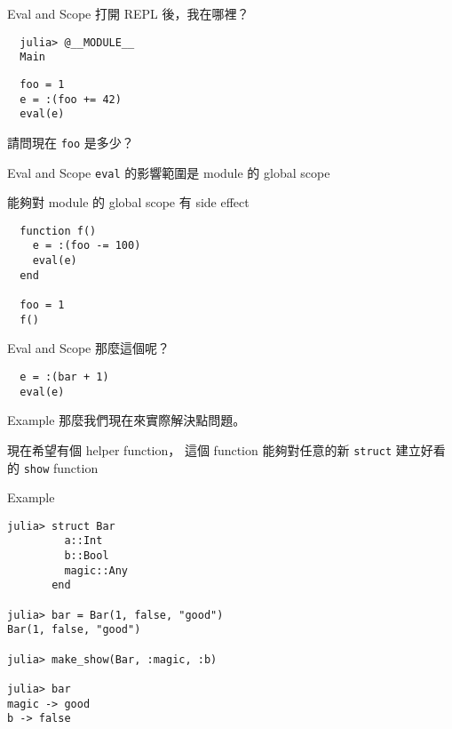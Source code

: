 \documentclass[14pt]{beamer}
\begin{document}
\begin{frame}[fragile]{Eval and Scope}
  打開 REPL 後，我在哪裡？

  \pause

\begin{lstlisting}
  julia> @__MODULE__
  Main
\end{lstlisting}

  \pause

\begin{lstlisting}
  foo = 1
  e = :(foo += 42)
  eval(e)
\end{lstlisting}

  請問現在 \texttt{foo} 是多少？
\end{frame}


\begin{frame}[fragile]{Eval and Scope}
  \texttt{eval} 的影響範圍是 module 的 global scope

  能夠對 module 的 global scope 有 side effect

  \pause

\begin{lstlisting}
  function f()
    e = :(foo -= 100)
    eval(e)
  end

  foo = 1
  f()
\end{lstlisting}
\end{frame}


\begin{frame}[fragile]{Eval and Scope}
  那麼這個呢？

\begin{lstlisting}
  e = :(bar + 1)
  eval(e)
\end{lstlisting}
\end{frame}


\begin{frame}[fragile]{Example}
  那麼我們現在來實際解決點問題。

  \pause

  現在希望有個 helper function，
  這個 function 能夠對任意的新 \texttt{struct} 建立好看的 \texttt{show} function
\end{frame}


\begin{frame}[fragile]{Example}
\begin{lstlisting}
julia> struct Bar
         a::Int
         b::Bool
         magic::Any
       end

julia> bar = Bar(1, false, "good")
Bar(1, false, "good")

julia> make_show(Bar, :magic, :b)

julia> bar
magic -> good
b -> false
\end{lstlisting}
\end{frame}
\end{document}
